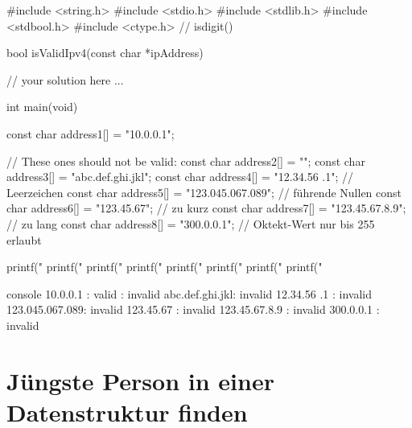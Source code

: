 \Vorlage
\begin{codebox}[lang=c, fontsize=\small]
#include <string.h>
#include <stdio.h>
#include <stdlib.h>
#include <stdbool.h>
#include <ctype.h> // isdigit()

bool isValidIpv4(const char *ipAddress) {

// your solution here ...

}

int main(void) {
    const char address1[] = "10.0.0.1";

    // These ones should not be valid:
    const char address2[] = "";
    const char address3[] = "abc.def.ghi.jkl";
    const char address4[] = "12.34.56 .1";      // Leerzeichen
    const char address5[] = "123.045.067.089";  // führende Nullen
    const char address6[] = "123.45.67";        // zu kurz
    const char address7[] = "123.45.67.8.9";    // zu lang
    const char address8[] = "300.0.0.1";        // Oktekt-Wert nur bis 255 erlaubt

    printf("%
    printf("%
    printf("%
    printf("%
    printf("%
    printf("%
    printf("%
    printf("%
}

\end{codebox}

\begin{mybox}[title=Bildschirmausgabe]{console}
10.0.0.1       : valid
               : invalid
abc.def.ghi.jkl: invalid
12.34.56 .1    : invalid
123.045.067.089: invalid
123.45.67      : invalid
123.45.67.8.9  : invalid
300.0.0.1      : invalid
\end{mybox}




\chapter{Jüngste Person in einer Datenstruktur finden}

\vspace{10pt}

